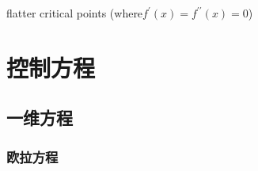 \documentclass{book}
\begin{document}
\begin{definition}
  \cite{WENO-Z-2016}
  flatter critical points (where$f^{\prime}(x)=f^{\prime \prime}(x)=0$)
\end{definition}


\section{控制方程}
\subsection{一维方程}
\subsubsection{欧拉方程}
\end{document}
